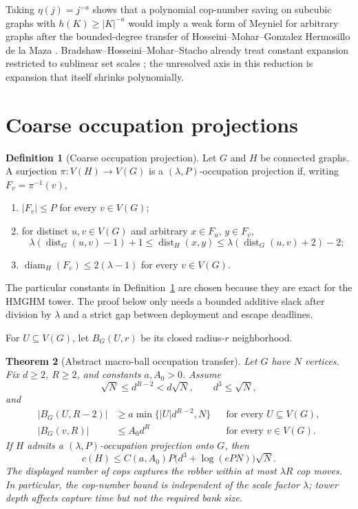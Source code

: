 \documentclass[11pt]{amsart}
\newtheorem{theorem}{Theorem}[section]
\theoremstyle{definition}
\newtheorem{definition}[theorem]{Definition}
\newcommand{\cnum}{c}
\newcommand{\dist}{\operatorname{dist}}
\newcommand{\diam}{\operatorname{diam}}
\begin{document}
Taking $\eta(j)=j^{-a}$ shows that a polynomial cop-number saving on
subcubic graphs with $h(K)\ge |K|^{-a}$ would imply a weak form of Meyniel for
arbitrary graphs after the bounded-degree transfer of
Hosseini--Mohar--Gonzalez Hermosillo de la Maza
\cite[Corollary~8]{HMGHM}.  Bradshaw--Hosseini--Mohar--Stacho already treat
constant expansion restricted to sublinear set scales \cite{BHMS}; the
unresolved axis in this reduction is expansion that itself shrinks
polynomially.

\section{Coarse occupation projections}

\begin{definition}[Coarse occupation projection]\label{def:projection}
Let $G$ and $H$ be connected graphs.  A surjection
$\pi:V(H)\to V(G)$ is a $(\lambda,P)$-occupation projection if, writing
$F_v=\pi^{-1}(v)$,
\begin{enumerate}[label=\textup{(\roman*)}]
\item $|F_v|\le P$ for every $v\in V(G)$;
\item for distinct $u,v\in V(G)$ and arbitrary $x\in F_u$, $y\in F_v$,
\[
 \lambda(\dist_G(u,v)-1)+1
 \le
 \dist_H(x,y)
 \le
 \lambda(\dist_G(u,v)+2)-2;
\]
\item $\diam_H(F_v)\le2(\lambda-1)$ for every $v\in V(G)$.
\end{enumerate}
\end{definition}

The particular constants in Definition~\ref{def:projection} are chosen because they are
exact for the HMGHM tower.  The proof below only needs a bounded additive
slack after division by $\lambda$ and a strict gap between deployment and
escape deadlines.

For $U\subseteq V(G)$, let $B_G(U,r)$ be its closed radius-$r$
neighborhood.

\begin{theorem}[Abstract macro-ball occupation transfer]\label{thm:abstract-transfer}
Let $G$ have $N$ vertices.  Fix $d\ge2$, $R\ge2$, and constants $a,A_0>0$.
Assume
\begin{equation}\label{eq:scale}
 \sqrt N\le d^{R-2}<d\sqrt N,
 \qquad
 d^3\le\sqrt N,
\end{equation}
and
\begin{align}
 |B_G(U,R-2)|
 &\ge a\min\{|U|d^{R-2},N\}
 &&\text{for every }U\subseteq V(G),\label{eq:lowergrowth}\\
 |B_G(v,R)|
 &\le A_0d^R
 &&\text{for every }v\in V(G).\label{eq:uppergrowth}
\end{align}
If $H$ admits a $(\lambda,P)$-occupation projection onto $G$, then
\[
 \boxed{
 \cnum(H)
 \le
 C(a,A_0)P\bigl(d^3+\log(ePN)\bigr)\sqrt N.
 }
\]
The displayed number of cops captures the robber within at most $\lambda R$
cop moves.  In particular, the cop-number bound is independent of the scale
factor $\lambda$; tower depth affects capture time but not the required bank
size.
\end{theorem}
\end{document}
